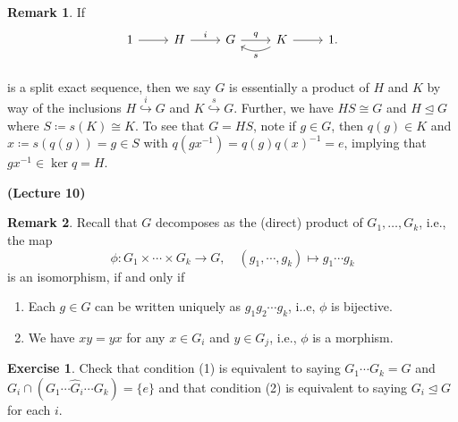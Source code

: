 \documentclass[10pt,letterpaper,cm]{nupset}
\theoremstyle{definition}
\newtheorem{remark}{Remark}
\newtheorem{exercise}{Exercise}
\newcommand{\1}{\mathbf{1}}
\newcommand{\0}{\vec 0}
\begin{document}
\begin{remark}
If  \[
	\begin{tikzcd}
	1\rar & H\rar["i" above] & G\rar["q" above] & K\rar\lar[bend left=30,"s" below] & 1. \\
	\end{tikzcd}
\]
is a split exact sequence, then we say $G$ is essentially a product of $H$ and $K$ by way of the inclusions $H \overset{i}{\hookrightarrow} G$ and $K \overset{s}{\hookrightarrow} G$. Further, we have $HS \cong G$ and $H \unlhd G$ where $S\coloneqq s(K) \cong K$. To see that $G = HS$, note if $g \in G$, then $q(g) \in K$ and $x\coloneqq  s(q(g)) = g \in S$ with $q(gx^{-1}) = q(g)q(x)^{-1} = e$, implying that $gx^{-1} \in \ker q = H$.
\end{remark}

\begin{center}
{\textbf{(Lecture 10)}}
\end{center}

\begin{remark}
Recall that $G$ decomposes as the (direct) product of $G_1, \ldots, G_k$, i.e., the map $$\phi : G_1 \times \cdots \times G_k \to G, \quad  (g_1, \cdots, g_k) \mapsto g_1\cdots g_k$$ is an isomorphism, if and only if
\begin{enumerate}
\item Each $g\in G$ can be written uniquely as $g_1 g_2\cdots g_k$, i..e, $\phi$ is bijective.
\item We have $xy = yx$ for any $x \in G_i$ and $y\in G_j$, i.e., $\phi$ is a morphism.
\end{enumerate}
\end{remark}

\begin{exercise}
Check that condition (1) is equivalent to saying $G_1 \cdots G_k = G$ and $G_i \cap (G_1 \cdots \widehat{G}_i \cdots G_k) = \{e\}$ and that condition (2) is equivalent to saying $G_i \unlhd G$ for each $i$.
\end{exercise}
\end{document}
